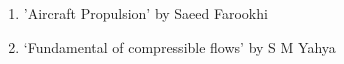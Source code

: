\begin{enumerate}
    \item 'Aircraft Propulsion' by Saeed Farookhi
    \item ‘Fundamental of compressible flows’ by S M Yahya

\end{enumerate}